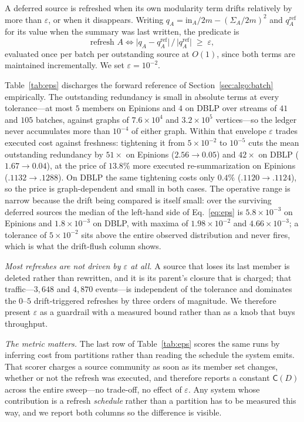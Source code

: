 A deferred source is refreshed when its own modularity term drifts relatively by
more than $\varepsilon$, or when it disappears. Writing
$q_A=\mathrm{in}_A/2m-(\Sigma_A/2m)^2$ and $q_A^{\text{ref}}$ for its value when
the summary was last written, the predicate is
\begin{equation}\label{eq:eps}
\text{refresh } A \iff
\bigl|q_A-q_A^{\text{ref}}\bigr| \,/\, \bigl|q_A^{\text{ref}}\bigr| \;\ge\; \varepsilon ,
\end{equation}
evaluated once per batch per outstanding source at $O(1)$, since both terms are
maintained incrementally. We set $\varepsilon=10^{-2}$.

Table~\ref{tab:eps} discharges the forward reference of
Section~\ref{sec:algo:batch} empirically. The outstanding redundancy is small in
absolute terms at every tolerance---at most $5$ members on Epinions and $4$ on
DBLP over streams of $41$ and $105$ batches, against graphs of $7.6\times10^{4}$
and $3.2\times10^{5}$ vertices---so the ledger never accumulates more than
$10^{-4}$ of either graph. Within that envelope $\varepsilon$ trades executed
cost against freshness: tightening it from $5\times10^{-2}$ to $10^{-5}$ cuts the
mean outstanding redundancy by $51\times$ on Epinions ($2.56\to0.05$) and
$42\times$ on DBLP ($1.67\to0.04$), at the price of $13.8\%$ more executed
re-summarization on Epinions ($.1132\to.1288$). On DBLP the same tightening costs
only $0.4\%$ ($.1120\to.1124$), so the price is graph-dependent and small in
both cases. The operative range is narrow because the drift being compared is
itself small: over the surviving deferred sources the median of the left-hand
side of Eq.~\ref{eq:eps} is $5.8\times10^{-3}$ on Epinions and
$1.8\times10^{-3}$ on DBLP, with maxima of $1.98\times10^{-2}$ and
$4.66\times10^{-3}$; a tolerance of $5\times10^{-2}$ sits above the entire
observed distribution and never fires, which is what the drift-flush column
shows.

\emph{Most refreshes are not driven by $\varepsilon$ at all.} A source that loses
its last member is deleted rather than rewritten, and it is its parent's closure
that is charged; that traffic---$3{,}648$ and $4{,}870$ events---is independent of
the tolerance and dominates the $0$--$5$ drift-triggered refreshes by three
orders of magnitude. We therefore present $\varepsilon$ as a guardrail with a
measured bound rather than as a knob that buys throughput.

\emph{The metric matters.} The last row of Table~\ref{tab:eps} scores the same
runs by inferring cost from partitions rather than reading the schedule the
system emits. That scorer charges a source community as soon as its member set
changes, whether or not the refresh was executed, and therefore reports a
constant $\mathsf C(D)$ across the entire sweep---no trade-off, no effect of
$\varepsilon$. Any system whose contribution is a refresh \emph{schedule} rather
than a partition has to be measured this way, and we report both columns so the
difference is visible.

